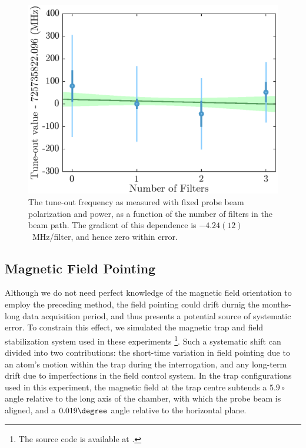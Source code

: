	\begin{figure}[t]
	    \centering
	    \includegraphics[width=\textwidth]{fig/tuneout/filt_dep}
	    \caption{The tune-out frequency as measured with fixed probe beam polarization and power, as a function of the number of filters in the beam path. The gradient of this dependence is \(-4.24(12)\)~MHz/filter, and hence zero within error.
	    }
	    \label{fig:broadband light dependence}
	\end{figure}



\subsection{Magnetic Field Pointing}
	
	Although we do not need perfect knowledge of the magnetic field orientation to employ the preceding method, the field pointing could drift durnig the months-long data acquisition period, and thus presents a potential source of systematic error.
	To constrain this effect, we simulated the magnetic trap \cite{Dall07_laser} and field stabilization system \cite{Dedman07} used in these experiments \footnote{The source code is available at \cite{mag_trap_simulator}.}.
	Such a systematic shift can divided into two contributions: the short-time variation in field pointing due to an atom's motion within the trap during the interrogation, and any long-term drift due to imperfections in the field control system.
	In the trap configurations used in this experiment, the magnetic field at the trap centre subtends a  $5.9 \circ $ angle relative to the long axis of the chamber, with which the probe beam is aligned, and a $0.019 \degree$ angle relative to the horizontal plane. 

